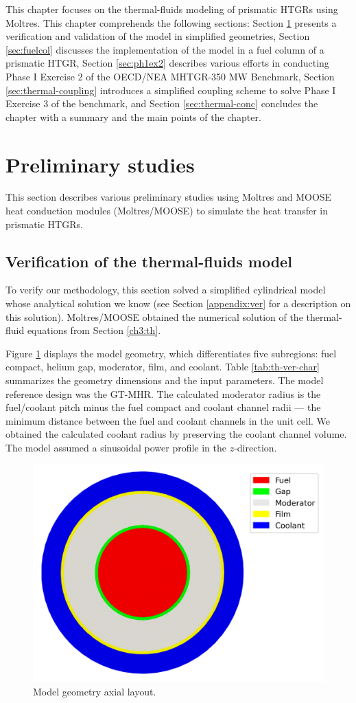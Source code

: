 \label{ch:thermalfluids}

This chapter focuses on the thermal-fluids modeling of prismatic HTGRs using Moltres.
This chapter comprehends the following sections: 
Section \ref{sec:thermal-prelim} presents a verification and validation of the model in simplified geometries,
Section \ref{sec:fuelcol} discusses the implementation of the model in a fuel column of a prismatic HTGR,
Section \ref{sec:ph1ex2} describes various efforts in conducting Phase I Exercise 2 of the OECD/NEA MHTGR-350 MW Benchmark, 
Section \ref{sec:thermal-coupling} introduces a simplified coupling scheme to solve Phase I Exercise 3 of the benchmark, and Section \ref{sec:thermal-conc} concludes the chapter with a summary and the main points of the chapter.

\section{Preliminary studies}
\label{sec:thermal-prelim}

This section describes various preliminary studies using Moltres and MOOSE heat conduction modules (Moltres/MOOSE) to simulate the heat transfer in prismatic HTGRs.

\subsection{Verification of the thermal-fluids model}

To verify our methodology, this section solved a simplified cylindrical model whose analytical solution we know (see Section \ref{appendix:ver} for a description on this solution).
Moltres/MOOSE obtained the numerical solution of the thermal-fluid equations from Section \ref{ch3:th}.

Figure \ref{fig:th-ver-mesh} displays the model geometry, which differentiates five subregions: fuel compact, helium gap, moderator, film, and coolant.
Table \ref{tab:th-ver-char} summarizes the geometry dimensions and the input parameters.
The model reference design was the GT-MHR.
The calculated moderator radius is the fuel/coolant pitch minus the fuel compact and coolant channel radii --- the minimum distance between the fuel and coolant channels in the unit cell.
We obtained the calculated coolant radius by preserving the coolant channel volume.
The model assumed a sinusoidal power profile in the $z$-direction.

\begin{figure}[htbp!]
	\centering
	\includegraphics[width=0.40\linewidth]{figures-thermal/ver-mesh2}
	\hfill
	\caption{Model geometry axial layout.}
	\label{fig:th-ver-mesh}
\end{figure}

